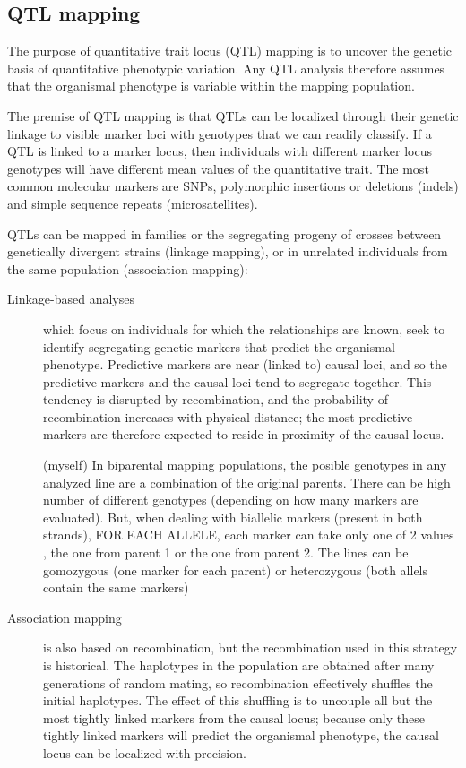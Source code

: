 \documentclass[a4paper,10pt]{article}
\begin{document}
\subsection{QTL mapping}
The purpose of quantitative trait locus (QTL) mapping is to uncover the genetic basis of quantitative phenotypic variation. 
Any QTL analysis therefore assumes that the organismal phenotype is variable within the mapping population.

The premise of QTL mapping is that QTLs can be localized through their genetic linkage to visible marker loci with genotypes that we can readily classify. 
If a QTL is linked to a marker locus, then individuals with different marker locus genotypes will have different mean values of the quantitative trait.
The most common molecular markers are SNPs, polymorphic insertions or deletions (indels) and simple sequence repeats (microsatellites).

QTLs can be mapped in families or the segregating progeny of crosses between genetically divergent strains (linkage mapping), or in unrelated individuals from the same population (association mapping):
\begin{description}
 \item [Linkage-based analyses] which focus on individuals for which the relationships are known, seek to identify segregating genetic markers that predict the organismal phenotype.
 Predictive markers are near (linked to) causal loci, and so the predictive markers and the causal loci tend to segregate together.
This tendency is disrupted by recombination, and the probability of recombination increases with physical distance; the most predictive markers are therefore expected to reside in proximity of the causal locus.

(myself) In biparental mapping populations, the posible genotypes in any analyzed line are a combination of the original parents. There can be high number of different genotypes (depending on how many markers are evaluated).
But, when dealing with biallelic markers (present in both strands), FOR EACH ALLELE, each marker can take only one of 2 values , the one from parent 1 or the one from parent 2. 
The lines can be gomozygous (one marker for each parent) or heterozygous (both allels contain the same markers)

 
 \item[Association mapping] is also based on recombination, but the recombination used in this strategy is historical.
 The haplotypes in the population are obtained after many generations of random mating, so recombination effectively shuffles the initial haplotypes.
The effect of this shuffling is to uncouple all but the most tightly linked markers from the causal locus; because only these tightly linked markers will predict the organismal phenotype, the causal locus can be localized with precision.

\end{description}
\end{document}

